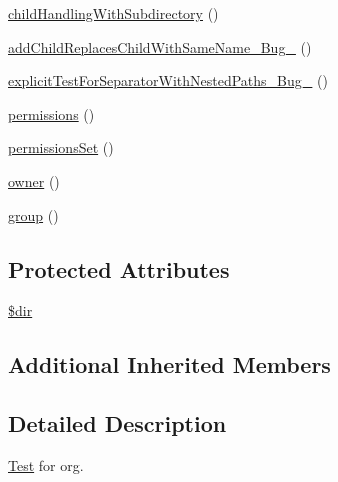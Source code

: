 \begin{DoxyCompactItemize}
\item 
\mbox{\hyperlink{classorg_1_1bovigo_1_1vfs_1_1vfs_stream_directory_test_case_a1d6f32f2f450bfcb95cd350dd6188f50}{child\+Handling\+With\+Subdirectory}} ()
\item 
\mbox{\hyperlink{classorg_1_1bovigo_1_1vfs_1_1vfs_stream_directory_test_case_abfacf101f57a41d4aeaff3fd791ec087}{add\+Child\+Replaces\+Child\+With\+Same\+Name\+\_\+\+Bug\+\_}} ()
\item 
\mbox{\hyperlink{classorg_1_1bovigo_1_1vfs_1_1vfs_stream_directory_test_case_aa40254887d3b012dd9b8f73f1c314e16}{explicit\+Test\+For\+Separator\+With\+Nested\+Paths\+\_\+\+Bug\+\_}} ()
\item 
\mbox{\hyperlink{classorg_1_1bovigo_1_1vfs_1_1vfs_stream_directory_test_case_a11e8d1e60a2c01e214a533f7bf44e872}{permissions}} ()
\item 
\mbox{\hyperlink{classorg_1_1bovigo_1_1vfs_1_1vfs_stream_directory_test_case_a8df718c02851465d6fe4a169e3fbbd8c}{permissions\+Set}} ()
\item 
\mbox{\hyperlink{classorg_1_1bovigo_1_1vfs_1_1vfs_stream_directory_test_case_a14420fb6943abecf9fcbacf2687e134d}{owner}} ()
\item 
\mbox{\hyperlink{classorg_1_1bovigo_1_1vfs_1_1vfs_stream_directory_test_case_ab623e0c8f02b387685ed4a31754f8de1}{group}} ()
\end{DoxyCompactItemize}
\subsection*{Protected Attributes}
\begin{DoxyCompactItemize}
\item 
\mbox{\hyperlink{classorg_1_1bovigo_1_1vfs_1_1vfs_stream_directory_test_case_a1659f0a629d408e0f849dbe4ee061e62}{\$dir}}
\end{DoxyCompactItemize}
\subsection*{Additional Inherited Members}


\subsection{Detailed Description}
\mbox{\hyperlink{class_test}{Test}} for org. 

